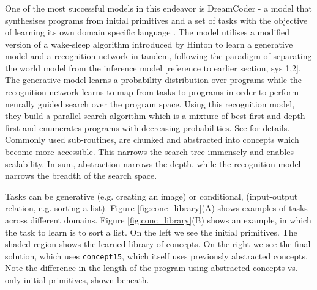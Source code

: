 \subsubsection{}
One of the most successful models in this endeavor is DreamCoder - a model that synthesises programs from initial primitives and a set of tasks with the objective of learning its own domain specific language \cite{ellis_dreamcoder_2021}. The model utilises a modified version of a wake-sleep algorithm introduced by Hinton to learn a generative model and a recognition network in tandem, following the paradigm of separating the world model from the inference model \cite{hinton1995wake} [reference to earlier section, sys 1,2]. The generative model learns a probability distribution over programs while the recognition network learns to map from tasks to programs in order to perform neurally guided search over the program space. Using this recognition model, they build a parallel search algorithm which is a mixture of best-first and depth-first and enumerates programs with decreasing probabilities. See \cite{Ellis_Wong_Nye_Sable-Meyer_Cary_Morales_Hewitt_Solar-Lezama_Tenenbaum} for details.
Commonly used sub-routines, are chunked and abstracted into concepts which become more accessible. This narrows the search tree immensely and enables scalability. In sum, abstraction narrows the depth, while the recognition model narrows the breadth of the search space.

Tasks can be generative (e.g. creating an image) or conditional, (input-output relation, e.g. sorting a list).
Figure \ref{fig:conc_library}(A) shows examples of tasks across different domains. 
Figure \ref{fig:conc_library}(B) shows an example, in which the task to learn is to sort a list. On the left we see the initial primitives. The shaded region shows the learned library of concepts. On the right we see the final solution, which uses \texttt{concept15}, which itself uses previously abstracted concepts. Note the difference in the length of the program using abstracted concepts vs. only initial primitives, shown beneath.

